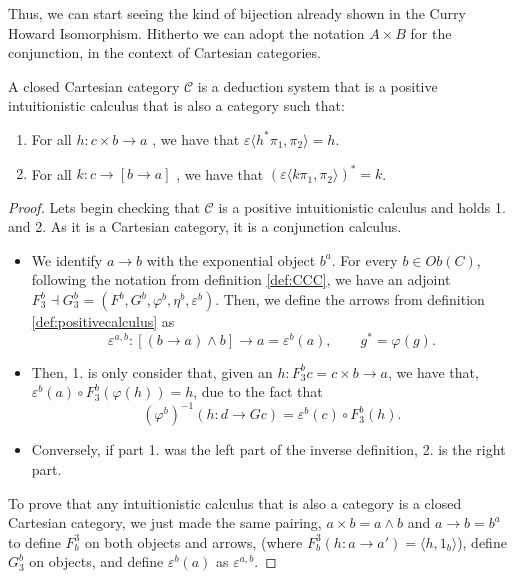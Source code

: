 Thus, we can start seeing the kind of bijection already shown in the Curry Howard Isomorphism. Hitherto we can adopt the notation $A\times B$ for the conjunction, in the context of Cartesian categories.
\begin{proposition}\label{def2:CCC}
  A closed Cartesian category $\mathcal{C}$ is a deduction system that is a positive intuitionistic calculus that is also a category such that:
  \begin{enumerate}
  \item   For all $h: c\times b \to a$ , we have that $\varepsilon \langle h^* \pi_1, \pi_2\rangle = h$.
  \item   For all $k: c\to [b \to a]$ , we have that $(\varepsilon \langle k \pi_1, \pi_2\rangle)^* = k$.
  \end{enumerate}
\end{proposition}

\begin{proof}
  
  Lets begin checking that $\mathcal{C}$ is a positive intuitionistic calculus and holds 1. and 2. As it is a Cartesian category, it is a conjunction calculus.
  \begin{itemize}
  \item We identify $a\to b$ with the exponential object $b^a$. For every $b\in Ob(C)$, following the notation from definition \ref{def:CCC}, we have an adjoint $F_3^b\dashv G_3^b = (F^b,G^b,\varphi^b,\eta^b,\varepsilon^b)$. Then, we define the arrows from definition \ref{def:positivecalculus} as
    $$\varepsilon^{a,b}: [(b \to a) \land b]\to a = \varepsilon^b(a), \qquad g^* = \varphi(g).$$
  \item Then, 1. is only consider that, given an $h: F_3^b c = c\times b \to a$, we have that, $\varepsilon^b(a) \circ F_3^b(\varphi(h)) = h$, due to the fact that $$(\varphi^b)^{-1}(h: d \to Gc) = \varepsilon^b(c)\circ F_3^b(h).$$
  \item Conversely, if part 1. was the left part of the inverse definition, 2. is the right part.
  \end{itemize}

  To prove that any intuitionistic calculus that is also a category is a closed Cartesian category, we just made the same pairing, $a\times b = a\land b$ and $a\to b = b^a$ to define $F_b^3$ on both objects and arrows, (where $F_b^3(h:a\to a') = \langle h, 1_b\rangle $), define $G_3^b$ on objects, and define $\varepsilon^b(a)$ as $\varepsilon^{a,b}$.
\end{proof}








